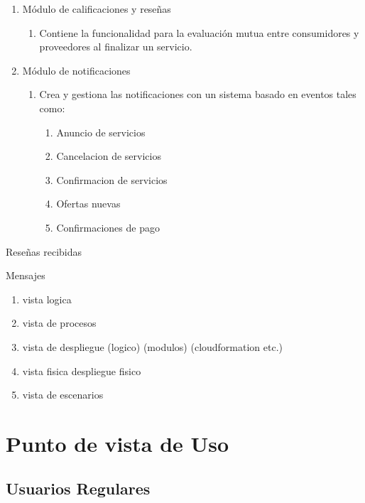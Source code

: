 \documentclass{article}
\begin{document}
\begin{enumerate}
      \item Módulo de calificaciones y reseñas   
        \begin{enumerate} 
          \item Contiene la funcionalidad para la evaluación mutua entre consumidores y proveedores al finalizar un servicio.  
        \end{enumerate} 
      \item Módulo de notificaciones  
      \begin{enumerate}
        \item Crea y gestiona las notificaciones con un sistema basado en eventos tales como: 
          \begin{enumerate}
            \item Anuncio de servicios
            \item Cancelacion de servicios
            \item Confirmacion de servicios
            \item Ofertas nuevas 
            \item Confirmaciones de pago 
          \end{enumerate}
      \end{enumerate} 

    \end{enumerate}




      Reseñas recibidas  

      Mensajes 

      \begin{enumerate}
        \item vista logica
        \item vista de procesos
        \item vista de despliegue
            (logico)
            (modulos)
            (cloudformation etc.)
        \item vista fisica
          despliegue fisico
        \item vista de escenarios

      \end{enumerate}
      


\section{Punto de vista de Uso}
  \subsection{ Usuarios Regulares}
\end{document}
